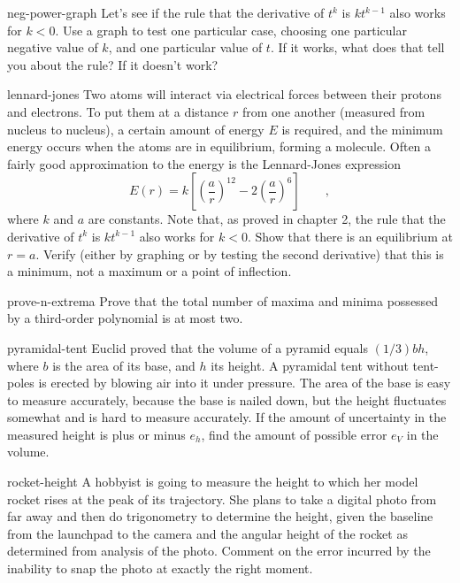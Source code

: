 \begin{hwsection}
\begin{hwwithsoln}{neg-power-graph}
Let's see if the rule that the derivative of $t^k$ is $kt^{k-1}$ also works for $k<0$.
Use a graph to test one particular case, choosing one particular negative value of $k$, and one 
particular value of $t$. If it works, what does that tell you about the rule? If it
doesn't work?
\end{hwwithsoln}

\begin{hwwithsoln}{lennard-jones}
Two atoms will interact via electrical forces between
their protons and electrons. To put them at a distance $r$ from one another (measured from
nucleus to nucleus), a certain amount of energy $E$ is required, and the minimum energy
occurs when the atoms are in equilibrium, forming a molecule. Often a fairly good approximation
to the energy is the Lennard-Jones expression
\begin{equation*}
  E(r) = k\left[\left(\frac{a}{r}\right)^{12}-2\left(\frac{a}{r}\right)^6\right] \qquad ,
\end{equation*}
where $k$ and $a$ are constants. Note that, as proved in chapter 2, the rule that
the derivative of $t^k$ is $kt^{k-1}$ also works for $k<0$.
Show that there is an equilibrium at $r=a$. Verify (either by graphing or by testing
the second derivative) that this is a minimum, not a maximum or a point of inflection.
\end{hwwithsoln}

\begin{hwwithsoln}{prove-n-extrema}
Prove that the total number of maxima and minima possessed by a third-order polynomial
is at most two.
\end{hwwithsoln}

\begin{hwwithsoln}{pyramidal-tent}
Euclid proved that the volume of a pyramid equals $(1/3)bh$, where $b$ is the area of its
base, and $h$ its height. A pyramidal tent without tent-poles is erected by blowing air
into it under pressure. The area of the base is easy to measure accurately, because the
base is nailed down, but the height fluctuates somewhat and is hard to measure accurately.
If the amount of uncertainty in the measured height is plus or minus $e_h$, find the
amount of possible error $e_V$ in the volume.
\end{hwwithsoln}

\begin{hwwithsoln}{rocket-height}
A hobbyist is going to measure the height to which her model rocket rises at the peak of
its trajectory. She plans to
take a digital photo from far away and then do trigonometry to determine the height,
given the baseline from the launchpad to the camera and the angular height of the rocket
as determined from analysis of the photo. Comment on the error incurred by the inability to
snap the photo at exactly the right moment.
\end{hwwithsoln}

\end{hwsection}
